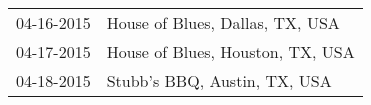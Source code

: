 \begin{supertabular}{ll}
 04-16-2015 &   House of Blues, Dallas, TX, USA \\
 04-17-2015 &  House of Blues, Houston, TX, USA \\
 04-18-2015 &      Stubb's BBQ, Austin, TX, USA \\
\end{supertabular}
